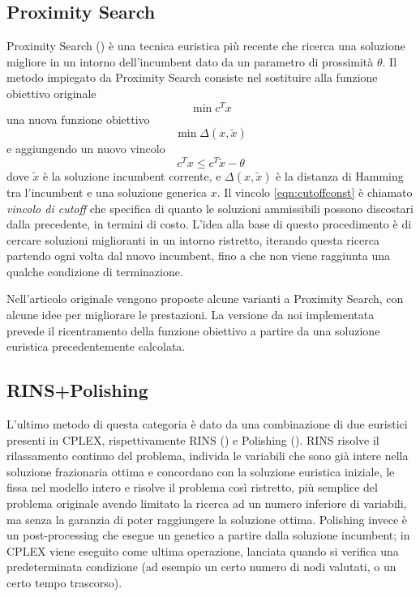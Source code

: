 \subsection{Proximity Search}
Proximity Search (\citet*{fischetti2012proximity}) è una tecnica euristica più recente che ricerca una soluzione migliore in un intorno dell’incumbent dato da un parametro di prossimità $\theta$. Il metodo impiegato da Proximity Search consiste nel sostituire alla funzione obiettivo originale 
\begin{equation}
  \min c^Tx
\end{equation}
una nuova funzione obiettivo 
\begin{equation}
  \min\Delta(x, \tilde{x})
\end{equation}
e aggiungendo un nuovo vincolo
\begin{equation}
  c^Tx \leq c^T\tilde{x} - \theta \label{eqn:cutoffconst}
\end{equation}
dove $\tilde{x}$ è la soluzione incumbent corrente, e $\Delta(x, \tilde{x})$ è la distanza di Hamming tra l'incumbent e una soluzione generica $x$. Il vincolo \ref{eqn:cutoffconst} è chiamato \textit{vincolo di cutoff} che specifica di quanto le soluzioni ammissibili possono discostari dalla precedente, in termini di costo. L’idea alla base di questo procedimento è di cercare soluzioni miglioranti in un intorno ristretto, iterando questa ricerca partendo ogni volta dal nuovo incumbent, fino a che non viene raggiunta una qualche condizione di terminazione.

Nell'articolo originale vengono proposte alcune varianti a Proximity Search, con alcune idee per migliorare le prestazioni. La versione da noi implementata prevede il ricentramento della funzione obiettivo a partire da una soluzione euristica precedentemente calcolata.

\subsection{RINS+Polishing}\label{sec:rins}
L’ultimo metodo di questa categoria è dato da una combinazione di due euristici presenti in CPLEX, rispettivamente RINS (\citet*{danna2005exploring}) e Polishing (\citet*{rothberg2007evolutionary}). RINS risolve il rilassamento continuo del problema, individa le variabili che sono già intere nella soluzione frazionaria ottima e concordano con la soluzione euristica iniziale, le fissa nel modello intero e risolve il problema così ristretto, più semplice del problema originale avendo limitato la ricerca ad un numero inferiore di variabili, ma senza la garanzia di poter raggiungere la soluzione ottima. Polishing invece è un post-processing che esegue un genetico a partire dalla soluzione incumbent; in CPLEX viene eseguito come ultima operazione, lanciata quando si verifica una predeterminata condizione (ad esempio un certo numero di nodi valutati, o un certo tempo trascorso).

